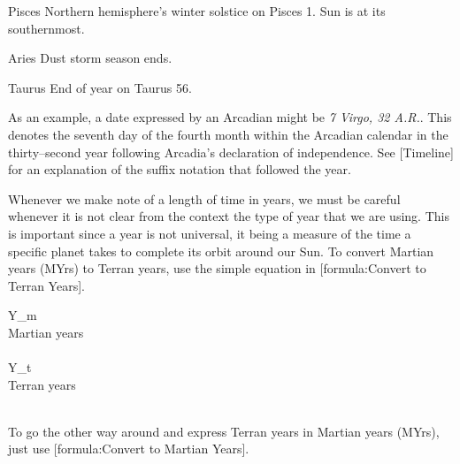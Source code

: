 {    \bTR
      \bTC Pisces \eTC
      \bTC \math{[270^{\circ}, 300^{\circ})} \eTC
       \eTC
       \eTC
      \bTC Northern hemisphere's winter solstice on Pisces 1. Sun is at its southernmost. \eTC
    \eTR
    
    \bTR
      \bTC Aries \eTC
      \bTC \math{[300^{\circ}, 330^{\circ})} \eTC
       \eTC
       \eTC
      \bTC Dust storm season ends. \eTC
    \eTR

    \bTR
      \bTC Taurus \eTC
      \bTC \math{[330^{\circ}, 360^{\circ})} \eTC
       \eTC
       \eTC
      \bTC End of year on Taurus 56. \eTC
    \eTR 
\eTABLEbody

\eTABLE
}

As an example, a date expressed by an Arcadian might be {\it 7 Virgo, 32 A.R.}. This denotes the seventh day of the fourth month within the Arcadian calendar in the thirty--second year following Arcadia's declaration of independence. See [Timeline] for an explanation of the suffix notation that followed the year.


Whenever we make note of a length of time in years, we must be careful whenever it is not clear from the context the type of year that we are using. This is important since a year is not universal, it being a measure of the time a specific planet takes to complete its orbit around our Sun. To convert Martian years (MYrs) to Terran years, use the simple equation in [formula:Convert to Terran Years].

\startformula
{}
\stopformula
\startlegend
\leg Y_m \\ Martian years\\ \\
\leg Y_t \\ Terran years \\ \\
\stoplegend
\crlf

To go the other way around and express Terran years in Martian years (MYrs), just use [formula:Convert to Martian Years].

\startformula
{}
\stopformula
\crlf

